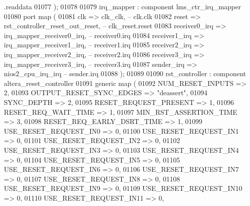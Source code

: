 \begin{DoxyCode}
{       .readdata}
01077         \textcolor{vhdlchar}{)};
01078 
01079     irq_mapper : \textcolor{keywordflow}{component} lms\_ctr\_irq\_mapper
01080         \textcolor{keywordflow}{port} \textcolor{keywordflow}{map} (
01081             clk           => clk_clk,\textcolor{keyword}{                        --       clk.clk}
01082             reset         => rst_controller_reset_out_reset,\textcolor{keyword}{ -- clk\_reset.reset}
01083             receiver0\_irq => irq_mapper_receiver0_irq,\textcolor{keyword}{       -- receiver0.irq}
01084             receiver1\_irq => irq_mapper_receiver1_irq,\textcolor{keyword}{       -- receiver1.irq}
01085             receiver2\_irq => irq_mapper_receiver2_irq,\textcolor{keyword}{       -- receiver2.irq}
01086             receiver3\_irq => irq_mapper_receiver3_irq,\textcolor{keyword}{       -- receiver3.irq}
01087             sender\_irq    => nios2_cpu_irq_irq               \textcolor{keyword}{--    sender.irq}
01088         \textcolor{vhdlchar}{)};
01089 
01090     rst_controller : \textcolor{keywordflow}{component} altera\_reset\_controller
01091         \textcolor{keywordflow}{generic} \textcolor{keywordflow}{map} (
01092             NUM\_RESET\_INPUTS          => \textcolor{vhdllogic}{2},
01093             OUTPUT\_RESET\_SYNC\_EDGES   => \textcolor{keyword}{"deassert"},
01094             SYNC\_DEPTH                => \textcolor{vhdllogic}{2},
01095             RESET\_REQUEST\_PRESENT     => \textcolor{vhdllogic}{1},
01096             RESET\_REQ\_WAIT\_TIME       => \textcolor{vhdllogic}{1},
01097             MIN\_RST\_ASSERTION\_TIME    => \textcolor{vhdllogic}{3},
01098             RESET\_REQ\_EARLY\_DSRT\_TIME => \textcolor{vhdllogic}{1},
01099             USE\_RESET\_REQUEST\_IN0     => \textcolor{vhdllogic}{0},
01100             USE\_RESET\_REQUEST\_IN1     => \textcolor{vhdllogic}{0},
01101             USE\_RESET\_REQUEST\_IN2     => \textcolor{vhdllogic}{0},
01102             USE\_RESET\_REQUEST\_IN3     => \textcolor{vhdllogic}{0},
01103             USE\_RESET\_REQUEST\_IN4     => \textcolor{vhdllogic}{0},
01104             USE\_RESET\_REQUEST\_IN5     => \textcolor{vhdllogic}{0},
01105             USE\_RESET\_REQUEST\_IN6     => \textcolor{vhdllogic}{0},
01106             USE\_RESET\_REQUEST\_IN7     => \textcolor{vhdllogic}{0},
01107             USE\_RESET\_REQUEST\_IN8     => \textcolor{vhdllogic}{0},
01108             USE\_RESET\_REQUEST\_IN9     => \textcolor{vhdllogic}{0},
01109             USE\_RESET\_REQUEST\_IN10    => \textcolor{vhdllogic}{0},
01110             USE\_RESET\_REQUEST\_IN11    => \textcolor{vhdllogic}{0},

\end{DoxyCode}

